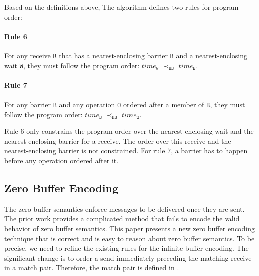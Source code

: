 Based on the definitions above, The algorithm defines two rules for program order:

\paragraph*{Rule 6} For any receive \texttt{R} that has a nearest-enclosing barrier \texttt{B} and a nearest-enclosing wait \texttt{W}, they must follow the program order:
$\mathit{time}_\mathtt{W}$ $\prec_\mathtt{HB}$ $\mathit{time}_\mathtt{B}$.

\paragraph*{Rule 7} For any barrier $\mathtt{B}$ and any operation $\mathtt{O}$ ordered after a member of $\mathtt{B}$, they must follow the program order: $\mathit{time}_\mathtt{B}$
$\prec_\mathtt{HB}$ $\mathit{time}_\mathtt{O}$.

Rule $6$ only constrains the program order over the nearest-enclosing wait and the nearest-enclosing barrier for a receive. The order over this receive and the nearest-enclosing barrier is not constrained. For rule $7$, a barrier has to happen before any operation ordered after it. 

\subsection{Zero Buffer Encoding}
The zero buffer semantics enforce messages to be delivered once they are sent. The prior work \cite{DBLP:conf/kbse/HuangMM13} provides a complicated method that fails to encode the valid behavior of zero buffer semantics. This paper presents a new zero buffer encoding technique that is correct and is easy to reason about zero buffer semantics. To be precise, we need to refine the existing rules for the infinite buffer encoding. The significant change is to order a send immediately preceding the matching receive in a match pair. Therefore, the match pair is defined in . 

